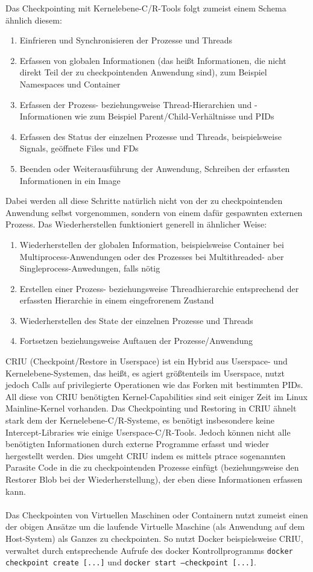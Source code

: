 \documentclass[a4paper]{article}
\begin{document}
Das Checkpointing mit Kernelebene-C/R-Tools folgt zumeist einem Schema ähnlich diesem:
\begin{enumerate}
    \item Einfrieren und Synchronisieren der Prozesse und Threads
    \item Erfassen von globalen Informationen (das heißt Informationen, die nicht direkt Teil der zu checkpointenden Anwendung sind), zum Beispiel Namespaces und Container
    \item Erfassen der Prozess- beziehungsweise Thread-Hierarchien und -Informationen wie zum Beispiel Parent/Child-Verhältnisse und PIDs
    \item Erfassen des Status der einzelnen Prozesse und Threads, beispielsweise Signals, geöffnete Files und FDs
    \item Beenden oder Weiterausführung der Anwendung, Schreiben der erfassten Informationen in ein Image
\end{enumerate}
Dabei werden all diese Schritte natürlich nicht von der zu checkpointenden Anwendung selbst vorgenommen, sondern von einem dafür gespawnten externen Prozess. Das Wiederherstellen funktioniert generell in ähnlicher Weise:
\begin{enumerate}
    \item Wiederherstellen der globalen Information, beispielsweise Container bei Multiprocess-Anwendungen oder des Prozesses bei Multithreaded- aber Singleprocess-Anwedungen, falls nötig
    \item Erstellen einer Prozess- beziehungsweise Threadhierarchie entsprechend der erfassten Hierarchie in einem eingefrorenem Zustand
    \item Wiederherstellen des State der einzelnen Prozesse und Threads
    \item Fortsetzen beziehungsweise Auftauen der Prozesse/Anwendung
\end{enumerate}
CRIU (Checkpoint/Restore in Userspace) ist ein Hybrid aus Userspace- und Kernelebene-Systemen, das heißt, es agiert größtenteils im Userspace, nutzt jedoch Calls auf privilegierte Operationen wie das Forken mit bestimmten PIDs. 
All diese von CRIU benötigten Kernel-Capabilities sind seit einiger Zeit im Linux Mainline-Kernel vorhanden.
Das Checkpointing und Restoring in CRIU ähnelt stark dem der Kernelebene-C/R-Systeme, es benötigt insbesondere keine Intercept-Libraries wie einige Userspace-C/R-Tools. 
Jedoch können nicht alle benötigten Informationen durch externe Programme erfasst und wieder hergestellt werden. 
Dies umgeht CRIU indem es mittels ptrace sogenannten Parasite Code in die zu checkpointenden Prozesse einfügt (beziehungsweise den Restorer Blob bei der Wiederherstellung), der eben diese Informationen erfassen kann.\\ \\
Das Checkpointen von Virtuellen Maschinen oder Containern nutzt zumeist einen der obigen Ansätze um die laufende Virtuelle Maschine (als Anwendung auf dem Host-System) als Ganzes zu checkpointen. 
So nutzt Docker beispielsweise CRIU, verwaltet durch entsprechende Aufrufe des docker Kontrollprogramms \texttt{docker checkpoint create [...]} und \texttt{docker start --checkpoint [...]}.
\end{document}
